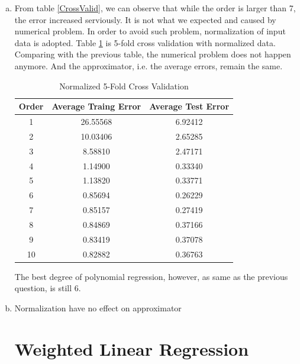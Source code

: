 \documentclass[a4paper, 12pt, titlepage]{article}
\begin{document}
\begin{enumerate}[(a)]
            Figure \ref{f} plots the data and the result of 6-order polynomial regression.

            \begin{figure}[H]
                \centering
                \texttt{[image: fig/6-order.eps]}
                \caption{6-order Regression}\label{g}
            \end{figure}

            Error = 1.0936

        \item From table \ref{CrossValid}, we can observe that while the order is larger than 7, the error increased serviously. It is not what we expected and caused by numerical problem. In order to avoid such problem, normalization of input data is adopted. Table \ref{NCrossValid} is 5-fold cross validation with normalized data. Comparing with the previous table, the numerical problem does not happen anymore. And the approximator, i.e. the average errors, remain the same.
            \begin{table}[H]
                \centering
                \begin{tabular}{ccc}
                Order & Average Traing Error & Average Test Error \\
                    \hline
                1 & 26.55568 & 6.92412 \\
                2 & 10.03406 & 2.65285 \\
                3 & 8.58810  & 2.47171 \\
                4 & 1.14900  & 0.33340 \\
                5 & 1.13820  & 0.33771 \\
                6 & 0.85694  & 0.26229 \\
                7 & 0.85157  & 0.27419 \\
                8 & 0.84869  & 0.37166 \\
                9 & 0.83419  & 0.37078 \\
                10 & 0.82882  & 0.36763 \\
                \end{tabular}
                \caption{Normalized 5-Fold Cross Validation}
                \label{NCrossValid}
            \end{table}

            The best degree of polynomial regression, however, as same as the previous question, is still 6.

        \item Normalization have no effect on approximator

            


\section{Weighted Linear Regression}

            

\end{enumerate}
\end{document}
